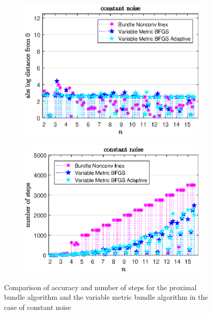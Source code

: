 \begin{figure}[ht]
	\begin{subfigure}{0.49\textwidth}
		\includegraphics[width=\textwidth]{Pictures/Plots/constant_noise.eps}%
	\end{subfigure}
	\begin{subfigure}{0.49\textwidth}
		\includegraphics[width=\textwidth]{Pictures/Plots/steps_constant_noise.eps}%
	\end{subfigure}
	\caption[Accuracy and number of steps: constant noise]{Comparison of accuracy and number of steps for the proximal bundle algorithm and the variable metric bundle algorithm in the case of constant noise}%
	\label{fig_const_noise}%
\end{figure}

